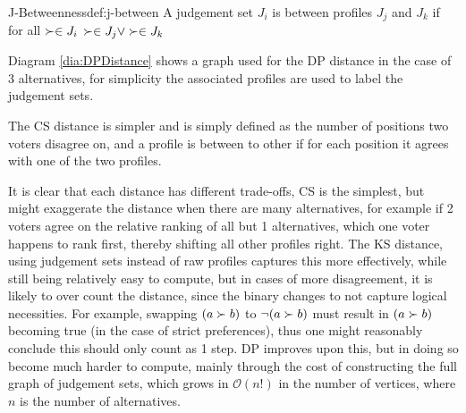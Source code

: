 \begin{definition}{J-Betweenness}{def:j-between}
	A judgement set $J_i$ is between profiles $J_j$ and $J_k$ if for all $\succ \in J_i$ $\succ \in J_j \vee \succ \in J_k$
\end{definition}
Diagram \ref{dia:DPDistance} shows a graph used for the DP distance in the case of 3 alternatives, for simplicity the associated profiles are used to label the judgement sets.



The CS distance is simpler and is simply defined as the number of positions two voters disagree on, and a profile is between to other if for each position it agrees with one of the two profiles. 

It is clear that each distance has different trade-offs, CS is the simplest, but might exaggerate the distance when there are many alternatives, for example if 2 voters agree on the relative ranking of all but 1 alternatives, which one voter happens to rank first, thereby shifting all other profiles right. The KS distance, using judgement sets instead of raw profiles captures this more effectively, while still being relatively easy to compute, but in cases of more disagreement, it is likely to over count the distance, since the binary changes to not capture logical necessities. For example, swapping $( a \succ b)$ to $\neg (a \succ b)$ must result in $(a \succ b)$ becoming true (in the case of strict preferences), thus one might reasonably conclude this should only count as 1 step. DP improves upon this, but in doing so become much harder to compute, mainly through the cost of constructing the full graph of judgement sets, which grows in $\mathcal{O}(n!)$ in the number of vertices, where $n$ is the number of alternatives. 



